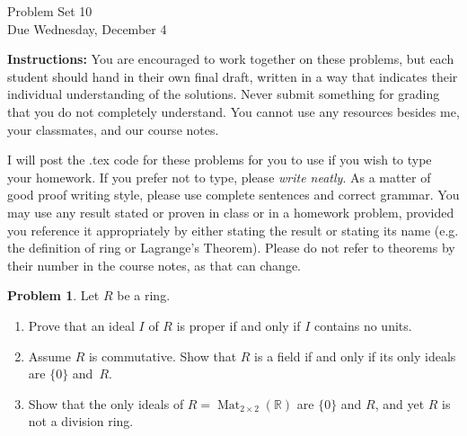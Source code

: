 \documentclass[11pt]{article}
\title{}
\date{\vspace{-0.5in}}
\newcommand{\R}{\mathbb{R}}
\DeclareMathOperator{\Mat}{Mat}
\theoremstyle{definition}
\newtheorem{problem}{Problem}
\begin{document}
\thispagestyle{fancy}
\pagestyle{fancy}


\begin{center}
	{\LARGE Problem Set 10\\}
	Due Wednesday, December 4
\end{center}

\vspace{0.5em}

\noindent
{\bf Instructions:}
You are encouraged to work together on these problems, but each student should hand in their own final draft, written in a way that indicates their individual understanding of the solutions. Never submit something for grading that you do not completely understand. You cannot use any resources besides me, your classmates, and our course notes.


I will post the .tex code for these problems for you to use if you wish to type your homework. If you prefer not to type, please  {\em write neatly}. As a matter of good proof writing style, please use complete sentences and correct grammar. You may use any result  stated or proven in class or in a homework problem, provided you reference it appropriately by either stating the result or stating its name (e.g. the definition of ring or Lagrange's Theorem). Please do not refer to theorems by their number in the course notes, as that can change.


\vspace{2em}




\begin{problem}
Let $R$ be a ring.	

\begin{enumerate}[label=(1.\arabic*),itemsep=-0.1em]
\vspace{-0.5em}
\item Prove that an ideal $I$ of $R$ is proper if and only if $I$ contains no units.

\item Assume $R$ is commutative.  Show that $R$ is a field if and only if its only ideals are $\{0\}$ and~$R$.

\item Show that the only ideals of $R = \Mat_{2 \times 2}(\R)$ are $\{0\}$ and $R$, and yet $R$ is not a division ring.
\end{enumerate}
\end{problem}
\end{document}
